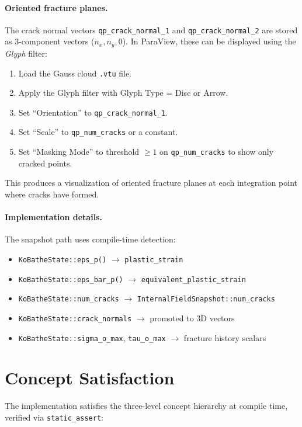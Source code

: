\paragraph{Oriented fracture planes.}
The crack normal vectors \texttt{qp\_crack\_normal\_1} and
\texttt{qp\_crack\_normal\_2} are stored as 3-component vectors
($n_x, n_y, 0$).  In ParaView, these can be displayed using the
\emph{Glyph} filter:
\begin{enumerate}
  \item Load the Gauss cloud \texttt{.vtu} file.
  \item Apply the Glyph filter with Glyph Type = Disc or Arrow.
  \item Set ``Orientation'' to \texttt{qp\_crack\_normal\_1}.
  \item Set ``Scale'' to \texttt{qp\_num\_cracks} or a constant.
  \item Set ``Masking Mode'' to threshold $\ge 1$ on
        \texttt{qp\_num\_cracks} to show only cracked points.
\end{enumerate}
This produces a visualization of oriented fracture planes at each
integration point where cracks have formed.

\paragraph{Implementation details.}
The snapshot path uses compile-time detection:
\begin{itemize}
  \item \texttt{KoBatheState::eps\_p()} $\to$ \texttt{plastic\_strain}
  \item \texttt{KoBatheState::eps\_bar\_p()} $\to$ \texttt{equivalent\_plastic\_strain}
  \item \texttt{KoBatheState::num\_cracks} $\to$ \texttt{InternalFieldSnapshot::num\_cracks}
  \item \texttt{KoBatheState::crack\_normals} $\to$ promoted to 3D vectors
  \item \texttt{KoBatheState::sigma\_o\_max}, \texttt{tau\_o\_max} $\to$ fracture history scalars
\end{itemize}

\section{Concept Satisfaction}
\label{sec:kb-concepts}

The implementation satisfies the three-level concept hierarchy at compile
time, verified via \texttt{static\_assert}:


